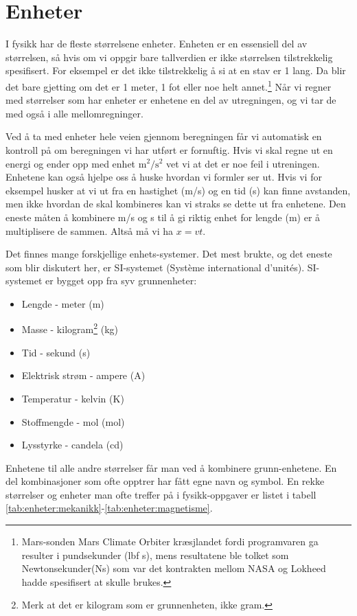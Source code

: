 \documentclass[a4paper,norsk,12pt]{book}
\begin{document}
\chapter{Enheter}
I fysikk har de fleste størrelsene enheter. Enheten er en essensiell del av størrelsen, så hvis om vi oppgir bare tallverdien er ikke størrelsen tilstrekkelig spesifisert. For eksempel er det ikke tilstrekkelig å si at en stav er 1 lang. Da blir det bare gjetting om det er 1 meter, 1 fot eller noe helt annet.\footnote{Mars-sonden Mars Climate Orbiter kræsjlandet fordi programvaren ga resulter i pundsekunder (lbf s), mens resultatene ble tolket som Newtonsekunder(Ns) som var det kontrakten mellom NASA og Lokheed hadde spesifisert at skulle brukes.} Når vi regner med størrelser som har enheter er enhetene en del av utregningen, og vi tar de med også i alle mellomregninger.

Ved å ta med enheter hele veien gjennom beregningen får vi automatisk en kontroll på om beregningen vi har utført er fornuftig. Hvis vi skal regne ut en energi og ender opp med enhet $\mathrm{m^2/s^2}$ vet vi at det er noe feil i utreningen. Enhetene kan også hjelpe oss å huske hvordan vi formler ser ut. Hvis vi for eksempel husker at vi ut fra en hastighet (m/s) og en tid (s) kan finne avstanden, men ikke hvordan de skal kombineres kan vi straks se dette ut fra enhetene. Den eneste måten å kombinere m/s og s til å gi riktig enhet for lengde (m) er å multiplisere de sammen. Altså må vi ha $x = vt$.

Det finnes mange forskjellige enhets-systemer. Det mest brukte, og det eneste som blir diskutert her, er SI-systemet (Système international d'unités). SI-systemet er bygget opp fra syv grunnenheter:
\begin{itemize}
\item Lengde - meter (m)
\item Masse - kilogram\footnote{Merk at det er kilogram som er grunnenheten, ikke gram.} (kg)
\item Tid - sekund (s)
\item Elektrisk strøm - ampere (A)
\item Temperatur - kelvin (K)
\item Stoffmengde - mol (mol)
\item Lysstyrke - candela (cd)
\end{itemize}
Enhetene til alle andre størrelser får man ved å kombinere grunn-enhetene. En del kombinasjoner som ofte opptrer har fått egne navn og symbol. En rekke størrelser og enheter man ofte treffer på i fysikk-oppgaver er listet i tabell \ref{tab:enheter:mekanikk}-\ref{tab:enheter:magnetisme}.
\end{document}
